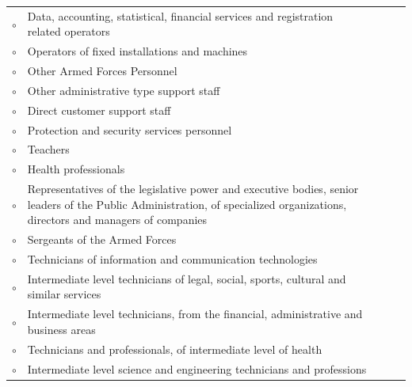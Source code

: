 \begin{center}
\begin{longtable}{r *{4}{ p{10cm} }}
        {\huge $\circ$}\hspace{1cm} & Data, accounting, statistical, financial services and registration related operators \\[0.2cm]
        {\huge $\circ$}\hspace{1cm} & Operators of fixed installations and machines \\[0.2cm]
        {\huge $\circ$}\hspace{1cm} & Other Armed Forces Personnel \\[0.2cm]
        {\huge $\circ$}\hspace{1cm} & Other administrative type support staff \\[0.2cm]
        {\huge $\circ$}\hspace{1cm} & Direct customer support staff \\[0.2cm]
        {\huge $\circ$}\hspace{1cm} & Protection and security services personnel \\[0.2cm]
        {\huge $\circ$}\hspace{1cm} & Teachers \\[0.2cm]
        {\huge $\circ$}\hspace{1cm} & Health professionals \\[0.2cm]
        {\huge $\circ$}\hspace{1cm} & Representatives of the legislative power and executive bodies, senior leaders of the Public Administration, of specialized organizations, directors and managers of companies \\[0.2cm]
        {\huge $\circ$}\hspace{1cm} & Sergeants of the Armed Forces \\[0.2cm]
        {\huge $\circ$}\hspace{1cm} & Technicians of information and communication technologies \\[0.2cm]
        {\huge $\circ$}\hspace{1cm} & Intermediate level technicians of legal, social, sports, cultural and similar services \\[0.2cm]
        {\huge $\circ$}\hspace{1cm} & Intermediate level technicians, from the financial, administrative and business areas \\[0.2cm]
        {\huge $\circ$}\hspace{1cm} & Technicians and professionals, of intermediate level of health \\[0.2cm]
        {\huge $\circ$}\hspace{1cm} & Intermediate level science and engineering technicians and professions \\[0.2cm]

\end{longtable}
\end{center}
